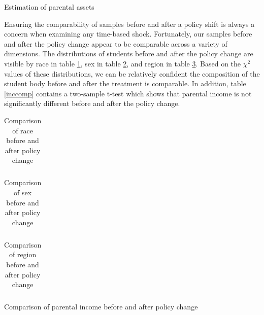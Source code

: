 \documentclass{article}
\begin{document}
	\begin{table}
		\centering
		
		\caption{Estimation of parental assets}
		\label{assetTab}
	\end{table}

	Ensuring the comparability of samples before and after a policy shift is always a concern when examining any time-based shock. Fortunately, our samples before and after the policy change appear to be comparable across a variety of dimensions. The distributions of students before and after the policy change are visible by race in table \ref{racecomp}, sex in table \ref{sexcomp}, and region in table \ref{regioncomp}. Based on the $\chi^2$ values of these distributions, we can be relatively confident the composition of the student body before and after the treatment is comparable. In addition, table \ref{inccomp} contains a two-sample t-test which shows that parental income is not significantly different before and after the policy change. 
	
{
	\begin{table}
		\centering
		\begin{tabular}{lrrrrrrrr}
						
		\end{tabular}
		\caption{Comparison of race before and after policy change}
		\label{racecomp}
	\end{table}

	\begin{table}
		\centering
		\begin{tabular}{lrrrrrr}
			
		\end{tabular}
		\caption{Comparison of sex before and after policy change}
		\label{sexcomp}
	\end{table}

	\begin{table}
	\centering
	\begin{tabular}{lrrrrrrrrrr}
		
	\end{tabular}
		\caption{Comparison of region before and after policy change}
		\label{regioncomp}
	\end{table}

	\begin{table}
		\centering
		
		\caption{Comparison of parental income before and after policy change}
		\label{inccomp}
	\end{table}

}
	
\end{document}
